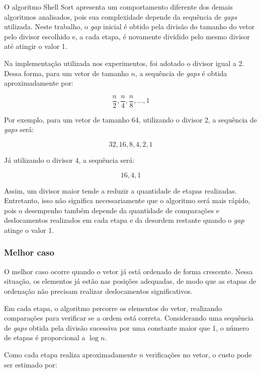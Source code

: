 O algoritmo Shell Sort apresenta um comportamento diferente dos demais algoritmos analisados, pois sua complexidade depende da sequência de \textit{gaps} utilizada. Neste trabalho, o \textit{gap} inicial é obtido pela divisão do tamanho do vetor pelo divisor escolhido e, a cada etapa, é novamente dividido pelo mesmo divisor até atingir o valor 1.

Na implementação utilizada nos experimentos, foi adotado o divisor igual a 2. Dessa forma, para um vetor de tamanho \(n\), a sequência de \textit{gaps} é obtida aproximadamente por:

\begin{equation}
\frac{n}{2},\frac{n}{4},\frac{n}{8},\ldots,1
\end{equation}

Por exemplo, para um vetor de tamanho 64, utilizando o divisor 2, a sequência de \textit{gaps} será:

\begin{equation}
32,16,8,4,2,1
\end{equation}

Já utilizando o divisor 4, a sequência será:

\begin{equation}
16,4,1
\end{equation}

Assim, um divisor maior tende a reduzir a quantidade de etapas realizadas. Entretanto, isso não significa necessariamente que o algoritmo será mais rápido, pois o desempenho também depende da quantidade de comparações e deslocamentos realizados em cada etapa e da desordem restante quando o \textit{gap} atinge o valor 1.

\subsubsection{Melhor caso}

O melhor caso ocorre quando o vetor já está ordenado de forma crescente. Nessa situação, os elementos já estão nas posições adequadas, de modo que as etapas de ordenação não precisam realizar deslocamentos significativos.

Em cada etapa, o algoritmo percorre os elementos do vetor, realizando comparações para verificar se a ordem está correta. Considerando uma sequência de \textit{gaps} obtida pela divisão sucessiva por uma constante maior que 1, o número de etapas é proporcional a \(\log n\).

Como cada etapa realiza aproximadamente \(n\) verificações no vetor, o custo pode ser estimado por:


